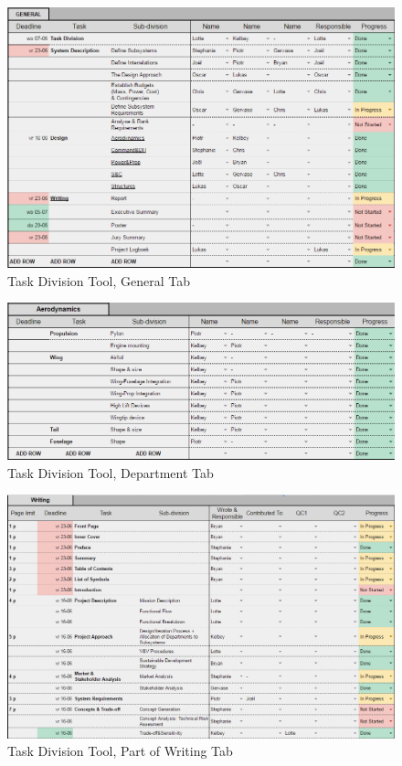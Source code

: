 \begin{figure}[H]
    \centering
    \includegraphics[scale=0.6]{Appendices/Figures/Taskdivisiongeneral}
    \caption{Task Division Tool, General Tab}
    \label{fig:task_divi_tool_gene}
\end{figure}

\begin{figure}[H]
    \centering
    \includegraphics[scale=0.6]{Appendices/Figures/Taskdivisiondepartment}
    \caption{Task Division Tool, Department Tab}
    \label{fig:task_divi_tool_depa}
\end{figure}

\begin{figure}[H]
    \centering
    \includegraphics[scale=0.6]{Appendices/Figures/Taskdivisionwriting}
    \caption{Task Division Tool, Part of Writing Tab}
    \label{fig:task_divi_tool_writ}
\end{figure}


